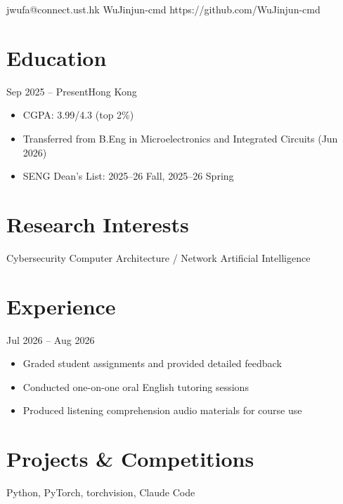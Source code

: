 \documentclass{common/resume}
\begin{document}
  {jwufa@connect.ust.hk}
  {WuJinjun-cmd}
  {https://github.com/WuJinjun-cmd}

\section{Education}

  {Sep 2025 -- Present}{Hong Kong}

\begin{itemize}
  \item CGPA: 3.99/4.3 (top 2\%)
  \item Transferred from B.Eng in Microelectronics and Integrated Circuits (Jun 2026)
  \item SENG Dean's List: 2025--26 Fall, 2025--26 Spring
\end{itemize}

\section{Research Interests}

Cybersecurity \textbullet{} Computer Architecture / Network \textbullet{} Artificial Intelligence

\section{Experience}

  {Jul 2026 -- Aug 2026}{}

\begin{itemize}
  \item Graded student assignments and provided detailed feedback
  \item Conducted one-on-one oral English tutoring sessions
  \item Produced listening comprehension audio materials for course use
\end{itemize}

\section{Projects \& Competitions}

  {Python, PyTorch, torchvision, Claude Code}
\end{document}
